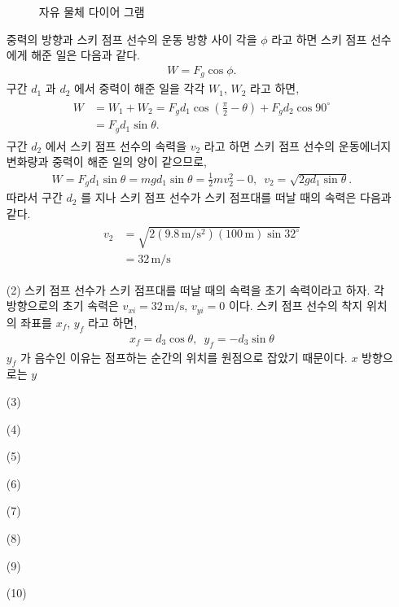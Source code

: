 \documentclass[floatfix,nofootinbib,superscriptaddress,fleqn]{revtex4-2}
\begin{document}
\begin{itemize}
\begin{figure}[h]
 \caption{자유 물체 다이어 그램}
  \end{figure}
  중력의 방향과 스키 점프 선수의 운동 방향 사이 각을 $\phi$ 라고 하면 
  스키 점프 선수에게 해준 일은 다음과 같다.
  \begin{align}
  W = F_g\cos{\phi}  .
  \end{align}
  구간 $d_1$ 과 $d_2$ 에서 중력이 해준 일을 각각 $W_1$, $W_2$ 라고 하면,
  \begin{align}
    \begin{split}
      W &= W_1 + W_2 
      = F_g d_1\cos{\left(\frac{\pi}{2}-\theta\right)} + F_gd_2\cos{90^\circ}  \\
      &=F_g d_1\sin{\theta}.
     \end{split}
  \end{align}
  구간 $d_2$ 에서 스키 점프 선수의 속력을 $v_2$ 라고 하면 
  스키 점프 선수의 운동에너지 변화량과 중력이 해준 일의 양이 같으므로,
  \begin{align}
    W = F_g d_1\sin{\theta}=mgd_1\sin{\theta}=\frac{1}{2}mv_2^2-0,\,\,\, 
    v_2 = \sqrt{2gd_1\sin{\theta}}.
  \end{align}
  따라서 구간 $d_2$ 를 지나 스키 점프 선수가 스키 점프대를 떠날 때의 속력은 다음과 같다.
  \begin{align}
    \begin{split}
      v_2 &= \sqrt{2(9.8\,\mathrm{m/s^2})(100\,\mathrm{m})\sin{32^\circ}}  \\
      &= 32\,\mathrm{m/s}
    \end{split}
  \end{align}
  \item[(2)] 스키 점프 선수가 스키 점프대를 떠날 때의 속력을 초기 속력이라고 하자. 
  각 방향으로의 초기 속력은 $v_{xi}=32\,\mathrm{m/s}$, $v_{yi}=0$ 이다. 
  스키 점프 선수의 착지 위치의 좌표를 $x_f$, $y_f$ 라고 하면,
  \begin{align}
    x_f = d_3\cos{\theta},\,\,\, y_f = -d_3\sin{\theta}
  \end{align}
  $y_f$ 가 음수인 이유는 점프하는 순간의 위치를 원점으로 잡았기 때문이다. 
  $x$ 방향으로는  $y$
  \item[(3)] 
  \item[(4)] 
  \item[(5)] 
  \item[(6)] 
  \item[(7)] 
  \item[(8)] 
  \item[(9)] 
  \item[(10)] 

\end{itemize} 
\end{document}
